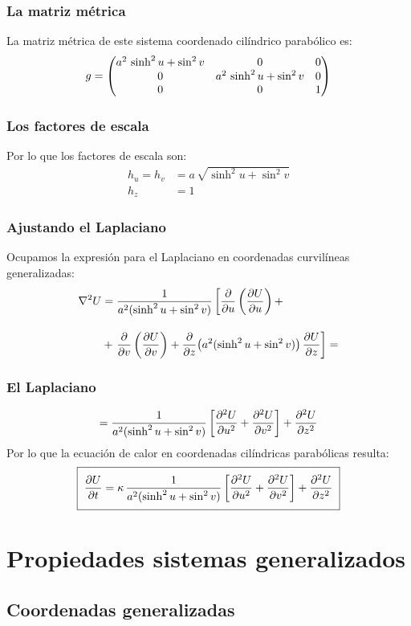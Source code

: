 \documentclass[12pt]{beamer}
\begin{document}
\begin{frame}
\frametitle{La matriz métrica}
La matriz métrica de este sistema coordenado cilíndrico parabólico es:
\begin{align*}
g = \mqty(
a^{2} \,\sinh^{2} u + \sin^{2} v & 0 & 0 \\
0 & a^{2} \, \sinh^{2} u + \sin^{2} v & 0 \\
0 & 0 & 1
)
\end{align*}
\end{frame}
\begin{frame}
\frametitle{Los factores de escala}
Por lo que los factores de escala son:
\begin{align*}
h_{u} = h_{v} &= a \, \sqrt{\sinh^{2} u + \sin^{2} v} \\[0.5em]
h_{z} &= 1
\end{align*}
\end{frame}
\begin{frame}
\frametitle{Ajustando el Laplaciano}
Ocupamos la expresión para el Laplaciano en coordenadas curvilíneas generalizadas:
\begin{align*}
\laplacian{U} &= \dfrac{1}{a^{2} (\sinh^{2} u + \sin^{2} v)} \left[ \pdv{u} \left( \pdv{U}{u} \right) + \right. \\[1em]
&+ \left. \pdv{v} \left( \pdv{U}{v} \right) + \pdv{z} \big( a^{2} (\sinh^{2} u + \sin^{2} v) \big) \, \pdv{U}{z} \right] =
\end{align*}
\end{frame}
\begin{frame}
\frametitle{El Laplaciano}
\begin{align*}
= \dfrac{1}{a^{2} (\sinh^{2} u + \sin^{2} v)}  \left[ \pdv[2]{U}{u} + \pdv[2]{U}{v} \right] + \pdv[2]{U}{z}
\end{align*}
Por lo que la ecuación de calor en coordenadas cilíndricas parabólicas resulta:
\begin{align*}
\setlength{\fboxsep}{2\fboxsep}\boxed{
\pdv{U}{t} = \kappa \, \dfrac{1}{a^{2} (\sinh^{2} u + \sin^{2} v)}  \left[ \pdv[2]{U}{u} + \pdv[2]{U}{v} \right] + \pdv[2]{U}{z}
}
\end{align*}
\end{frame}

\section{Propiedades sistemas generalizados}

\subsection{Coordenadas generalizadas}
\end{document}
